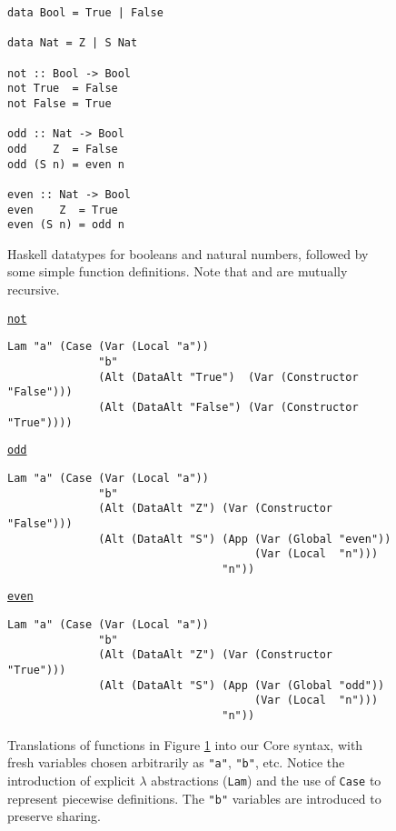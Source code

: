 \begin{figure}
  \begin{haskell}\begin{verbatim}
data Bool = True | False

data Nat = Z | S Nat

not :: Bool -> Bool
not True  = False
not False = True

odd :: Nat -> Bool
odd    Z  = False
odd (S n) = even n

even :: Nat -> Bool
even    Z  = True
even (S n) = odd n\end{verbatim}
  \end{haskell}
  \caption{Haskell datatypes for booleans and natural numbers, followed by some simple function definitions. Note that  and  are mutually recursive.}
  \label{fig:haskellexample}
\end{figure}

\begin{figure}
  \begin{small}
    \underline{\texttt{not}}
    \begin{verbatim}
Lam "a" (Case (Var (Local "a"))
              "b"
              (Alt (DataAlt "True")  (Var (Constructor "False")))
              (Alt (DataAlt "False") (Var (Constructor "True"))))
    \end{verbatim}

    \underline{\texttt{odd}}
    \begin{verbatim}
Lam "a" (Case (Var (Local "a"))
              "b"
              (Alt (DataAlt "Z") (Var (Constructor "False")))
              (Alt (DataAlt "S") (App (Var (Global "even"))
                                      (Var (Local  "n")))
                                 "n"))
    \end{verbatim}

    \underline{\texttt{even}}
    \begin{verbatim}
Lam "a" (Case (Var (Local "a"))
              "b"
              (Alt (DataAlt "Z") (Var (Constructor "True")))
              (Alt (DataAlt "S") (App (Var (Global "odd"))
                                      (Var (Local  "n")))
                                 "n"))
    \end{verbatim}
  \end{small}
  \caption{Translations of functions in Figure \ref{fig:haskellexample} into our Core syntax, with fresh variables chosen arbitrarily as \texttt{"a"}, \texttt{"b"}, etc. Notice the introduction of explicit $\lambda$ abstractions (\texttt{Lam}) and the use of \texttt{Case} to represent piecewise definitions. The \texttt{"b"} variables are introduced to preserve sharing.}
  \label{fig:coreexample}
\end{figure}

